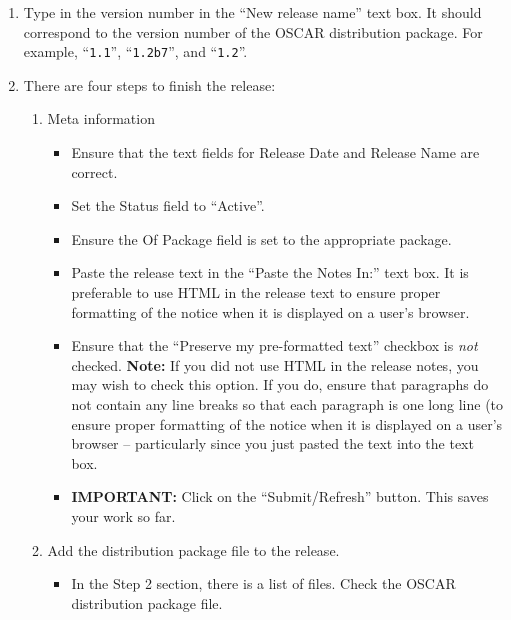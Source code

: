 \begin{enumerate}
\item Type in the version number in the ``New release name'' text
  box.  It should correspond to the version number of the OSCAR
  distribution package.  For example, ``{\tt 1.1}'', ``{\tt 1.2b7}'',
  and ``{\tt 1.2}''.

\item There are four steps to finish the release:

  \begin{enumerate}

    \item Meta information
      \begin{itemize}
      \item Ensure that the text fields for Release Date and Release
        Name are correct.
        
      \item Set the Status field to ``Active''.
        
      \item Ensure the Of Package field is set to the appropriate
        package.
        
      \item Paste the release text in the ``Paste the Notes In:'' text
        box.  It is preferable to use HTML in the release text to
        ensure proper formatting of the notice when it is displayed on
        a user's browser.
        
      \item Ensure that the ``Preserve my pre-formatted text''
        checkbox is {\em not} checked.  {\bf Note:} If you did not use
        HTML in the release notes, you may wish to check this option.
        If you do, ensure that paragraphs do not contain any line
        breaks so that each paragraph is one long line (to ensure
        proper formatting of the notice when it is displayed on a
        user's browser -- particularly since you just pasted the text
        into the text box.

      \item {\bf IMPORTANT:} Click on the ``Submit/Refresh'' button.
        This saves your work so far.
      \end{itemize}

  \item Add the distribution package file to the release.

    \begin{itemize}
    \item In the Step 2 section, there is a list of files.  Check the
      OSCAR distribution package file.
      

\end{itemize}
\end{enumerate}
\end{enumerate}

